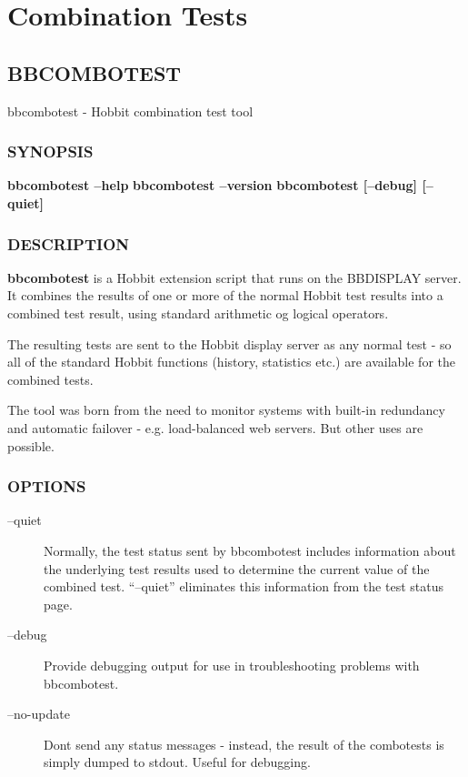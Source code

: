 %
\chapter{Combination Tests}

\section{BBCOMBOTEST}
 bbcombotest - Hobbit combination test tool 

\subsection{SYNOPSIS}
\textbf{bbcombotest --help}
\textbf{bbcombotest --version}
\textbf{bbcombotest [--debug] [--quiet]}


 
\subsection{DESCRIPTION}
\textbf{bbcombotest} is a Hobbit extension script that runs on the
BBDISPLAY server. It combines the results of one or more of the normal
Hobbit test results into a combined test result, using standard
arithmetic og logical operators. 


The resulting tests are sent to the Hobbit display server as any
normal test - so all of the standard Hobbit functions (history,
statistics etc.) are available for the combined tests. 


The tool was born from the need to monitor systems with built-in
redundancy and automatic failover - e.g. load-balanced web
servers. But other uses are possible. 

 
\subsection{OPTIONS}

\begin{description}
\item[--quiet] Normally, the test status sent by bbcombotest includes
  information about the underlying test results used to determine the
  current value of the combined test. ``--quiet'' eliminates this
  information from the test status page. 

\item[--debug] Provide debugging output for use in troubleshooting
  problems with bbcombotest. 


\item[--no-update] Dont send any status messages - instead, the result
  of the combotests is simply dumped to stdout. Useful for debugging. 



\end{description}
